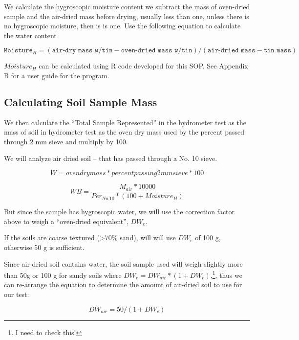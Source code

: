 \documentclass[12pt]{../SOP4_alpha}\usepackage[]{graphicx}\usepackage[]{xcolor}
\begin{document}
\NP We calculate the  hygroscopic moisture content we subtract the mass of oven-dried sample and the air-dried mass before drying, usually less than one, unless there is no hygroscopic moisture, then is is one. Use the following equation to calculate the water content

\begin{equation}
\texttt{Moisture}_H = (\texttt{air-dry mass w/tin} - \texttt{oven-dried mass w/tin})/(\texttt{air-dried mass} - \texttt{tin mass})
\end{equation}

\noindent $Moisture_H$ can be calculated using R code developed for this SOP. See Appendix B for a user guide for the program. 

\subsection{Calculating Soil Sample Mass}

\NP We then calculate the ``Total Sample Represented'' in the hydrometer test as the mass of soil in hydrometer test as the oven dry mass used by the percent passed through 2 mm sieve and multiply by 100.

\NP We will analyze air dried soil -- that has passed through a No. 10 sieve. 

\begin{equation}
W = oven dry mass * percent passing 2mm sieve * 100
\end{equation}

\begin{equation}
WB = \frac{M_{air}*10000}{Per_{No.10} * (100 + Moisture_H)}
\end{equation}

\NP But since the sample has hygroscopic water, we will use the correction factor above to weigh a ``oven-dried equivalent'', $DW_e$. 

\NP If the soils are coarse textured (>70\% sand), will will use $DW_e$ of 100 g, otherwise 50 g is sufficient.

\NP Since air dried soil contains water, the soil sample used will weigh slightly more than 50g or 100 g for sandy soils where $DW_e = DW_{air} * (1 + DW_c)$,\footnote{I need to check this!}, thus we can re-arrange the equation to determine the amount of air-dried soil to use for our test:

\begin{equation}
DW_{air} = 50/(1+DW_c)
\end{equation}
\end{document}
